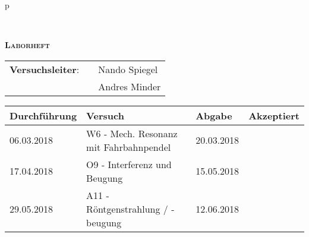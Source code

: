 \begin{tabular}{p{\textwidth}}

	\begin{center}
	\end{center}

\\

	\begin{center}
		\Huge{\textsc{\textbf{Laborheft}}}
	\end{center}

\vspace*{2cm}

	\begin{flushleft}
		\begin{tabular}{lll}
			\LARGE \textbf{Versuchsleiter}: & 	\hspace{2cm} & \LARGE Nando Spiegel\\
											& 	\hspace{2cm} & \LARGE Andres Minder\\
		\end{tabular}
	\end{flushleft}

\vspace*{2cm}

	\begin{center}
	\renewcommand{\arraystretch}{4}
	\large
		\begin{tabular}{|l|l|l|l|}
			\hline 
			\textbf{Durchführung} & \textbf{Versuch} & \textbf{Abgabe} & \textbf{Akzeptiert} \\ 
			\hline 
			06.03.2018 & W6 - Mech. Resonanz mit Fahrbahnpendel & 20.03.2018 &  \\ 
			\hline 
			17.04.2018 & O9 - Interferenz und Beugung 			& 15.05.2018 &  \\ 
			\hline 
			29.05.2018 & A11 - Röntgenstrahlung / -beugung 		& 12.06.2018 &  \\ 
			\hline 
		\end{tabular}
	\end{center}
		 

\end{tabular}